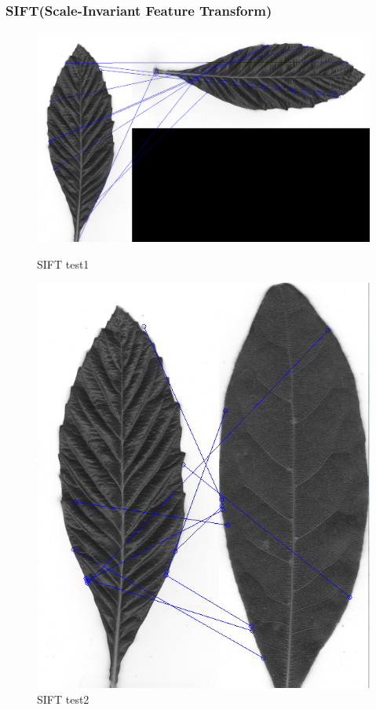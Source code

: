 \documentclass[xcolor=table]{beamer}
\begin{document}
\begin{frame} \frametitle{SIFT(Scale-Invariant Feature Transform)}
\begin{figure}[htbp]
    \begin{minipage}[c]{.45\linewidth}
      \begin{center}
	\includegraphics[scale=0.20]{Capture1.png}
	\caption{SIFT test1}
	\label{figure:Illustration}
      \end{center}
    \end{minipage}
    \hfill
    \begin{minipage}[c]{.45\linewidth}
      \begin{center}
	\includegraphics[scale=0.20]{Capture.png}
	\caption{SIFT test2}
	\label{figure:Illustration}
      \end{center}
    \end{minipage}
  \end{figure}
\end{frame}
\end{document}
